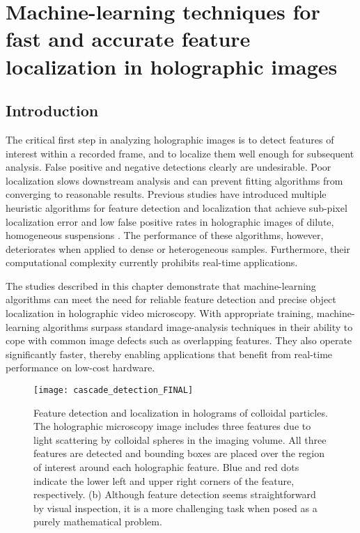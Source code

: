\chapter{Machine-learning techniques for fast and accurate feature localization in holographic images}
\label{ch:cascade}

\section{Introduction}

The critical first step in analyzing holographic images 
is to detect features of interest within a recorded frame,
and to localize them well enough for subsequent analysis\cite{cheong09}.
False positive and negative detections clearly are undesirable.
Poor localization slows downstream analysis
\cite{yevick14} and can prevent fitting algorithms 
from converging to reasonable results. Previous studies
have introduced multiple heuristic algorithms for feature detection and
localization that achieve
sub-pixel localization error and low false positive rates in
holographic images of dilute, homogeneous suspensions
\cite{crocker96,cheong09,krishnatreya14a}.
The performance of these algorithms, however, deteriorates when applied
to dense or heterogeneous samples. Furthermore, their computational
complexity currently prohibits real-time applications.

The studies described in this chapter demonstrate that machine-learning
algorithms can meet the
need for reliable feature detection and precise object localization in
holographic video microscopy. With appropriate training,
machine-learning algorithms surpass standard image-analysis
techniques in their ability to cope with common image defects
such as overlapping features.
They also operate significantly faster, thereby enabling
applications that benefit from real-time performance on low-cost
hardware.

\begin{figure}[b!]
  \centering
  \texttt{[image: cascade\_detection\_FINAL]}	
  \caption{ Feature detection and localization in holograms of colloidal particles.
    The holographic microscopy image includes three features due to light scattering by
    colloidal spheres in the imaging volume. All three features are detected and bounding
    boxes are placed over the region of interest around each holographic feature.
    Blue and red dots indicate the lower left and upper right corners of the feature,
    respectively. (b) Although feature
    detection seems straightforward by visual inspection, it is a more challenging
  task when posed as a purely mathematical problem.} 
  \label{fig:detection}
\end{figure}

